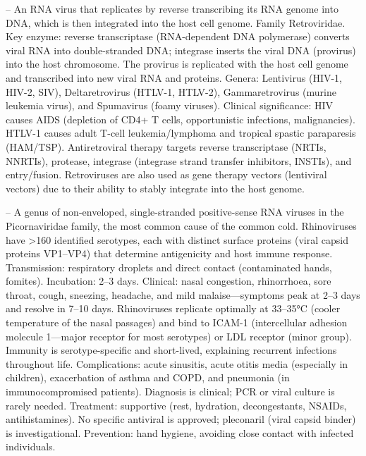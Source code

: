 -- An RNA virus that replicates by reverse transcribing its RNA genome into DNA, which is then integrated into the host cell genome. Family Retroviridae. Key enzyme: reverse transcriptase (RNA-dependent DNA polymerase) converts viral RNA into double-stranded DNA; integrase inserts the viral DNA (provirus) into the host chromosome. The provirus is replicated with the host cell genome and transcribed into new viral RNA and proteins. Genera: Lentivirus (HIV-1, HIV-2, SIV), Deltaretrovirus (HTLV-1, HTLV-2), Gammaretrovirus (murine leukemia virus), and Spumavirus (foamy viruses). Clinical significance: HIV causes AIDS (depletion of CD4+ T cells, opportunistic infections, malignancies). HTLV-1 causes adult T-cell leukemia/lymphoma and tropical spastic paraparesis (HAM/TSP). Antiretroviral therapy targets reverse transcriptase (NRTIs, NNRTIs), protease, integrase (integrase strand transfer inhibitors, INSTIs), and entry/fusion. Retroviruses are also used as gene therapy vectors (lentiviral vectors) due to their ability to stably integrate into the host genome.

-- A genus of non-enveloped, single-stranded positive-sense RNA viruses in the Picornaviridae family, the most common cause of the common cold. Rhinoviruses have >160 identified serotypes, each with distinct surface proteins (viral capsid proteins VP1--VP4) that determine antigenicity and host immune response. Transmission: respiratory droplets and direct contact (contaminated hands, fomites). Incubation: 2--3 days. Clinical: nasal congestion, rhinorrhoea, sore throat, cough, sneezing, headache, and mild malaise—symptoms peak at 2--3 days and resolve in 7--10 days. Rhinoviruses replicate optimally at 33--35°C (cooler temperature of the nasal passages) and bind to ICAM-1 (intercellular adhesion molecule 1—major receptor for most serotypes) or LDL receptor (minor group). Immunity is serotype-specific and short-lived, explaining recurrent infections throughout life. Complications: acute sinusitis, acute otitis media (especially in children), exacerbation of asthma and COPD, and pneumonia (in immunocompromised patients). Diagnosis is clinical; PCR or viral culture is rarely needed. Treatment: supportive (rest, hydration, decongestants, NSAIDs, antihistamines). No specific antiviral is approved; pleconaril (viral capsid binder) is investigational. Prevention: hand hygiene, avoiding close contact with infected individuals.

